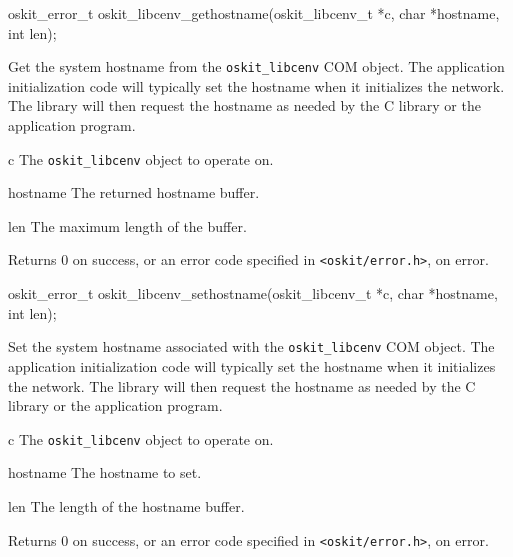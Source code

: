 \begin{apisyn}

	\funcproto oskit_error_t
		   oskit_libcenv_gethostname(oskit_libcenv_t *c,
				char *hostname, int len);
\end{apisyn}
\begin{apidesc}
	Get the system hostname from the \texttt{oskit_libcenv}
	COM object. The application initialization code will typically set
	the hostname when it initializes the network. The \posix{} library
	will then request the hostname as needed by the C library or the
	application program.
\end{apidesc}
\begin{apiparm}
	\item[c]
		The \texttt{oskit_libcenv} object to operate on.
	\item[hostname]
		The returned hostname buffer.
	\item[len]
		The maximum length of the buffer.
\end{apiparm}
\begin{apiret}
	Returns 0 on success, or an error code specified in
	{\tt <oskit/error.h>}, on error.
\end{apiret}


\begin{apisyn}

	\funcproto oskit_error_t
		   oskit_libcenv_sethostname(oskit_libcenv_t *c,
				char *hostname, int len);
\end{apisyn}
\begin{apidesc}
	Set the system hostname associated with the \texttt{oskit_libcenv}
	COM object. The application initialization code will typically set
	the hostname when it initializes the network. The \posix{} library
	will then request the hostname as needed by the C library or the
	application program.
\end{apidesc}
\begin{apiparm}
	\item[c]
		The \texttt{oskit_libcenv} object to operate on.
	\item[hostname]
		The hostname to set.
	\item[len]
		The length of the hostname buffer.
\end{apiparm}
\begin{apiret}
	Returns 0 on success, or an error code specified in
	{\tt <oskit/error.h>}, on error.
\end{apiret}


